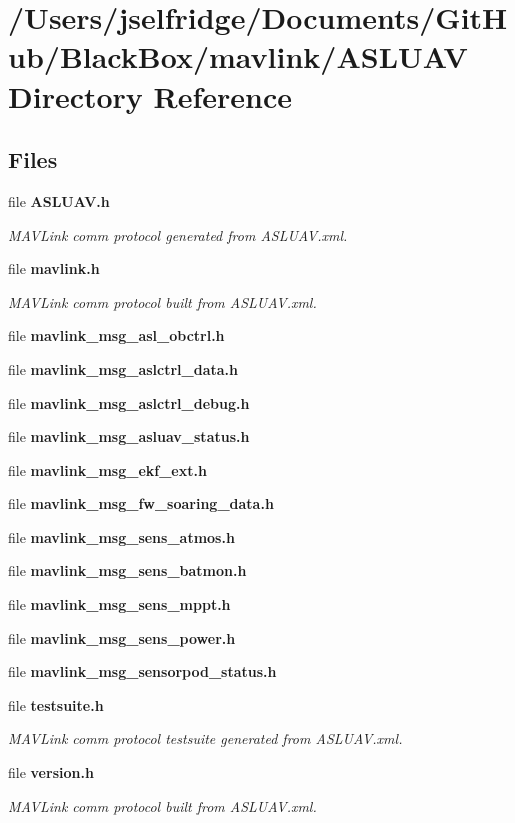 \section{/\+Users/jselfridge/\+Documents/\+Git\+Hub/\+Black\+Box/mavlink/\+A\+S\+L\+U\+AV Directory Reference}
\label{dir_024611f439788c642b5afb5423c3caaf}
\subsection*{Files}
\begin{DoxyCompactItemize}
\item 
file \textbf{ A\+S\+L\+U\+A\+V.\+h}
\begin{DoxyCompactList}\small\item\em M\+A\+V\+Link comm protocol generated from A\+S\+L\+U\+A\+V.\+xml. \end{DoxyCompactList}\item 
file \textbf{ mavlink.\+h}
\begin{DoxyCompactList}\small\item\em M\+A\+V\+Link comm protocol built from A\+S\+L\+U\+A\+V.\+xml. \end{DoxyCompactList}\item 
file \textbf{ mavlink\+\_\+msg\+\_\+asl\+\_\+obctrl.\+h}
\item 
file \textbf{ mavlink\+\_\+msg\+\_\+aslctrl\+\_\+data.\+h}
\item 
file \textbf{ mavlink\+\_\+msg\+\_\+aslctrl\+\_\+debug.\+h}
\item 
file \textbf{ mavlink\+\_\+msg\+\_\+asluav\+\_\+status.\+h}
\item 
file \textbf{ mavlink\+\_\+msg\+\_\+ekf\+\_\+ext.\+h}
\item 
file \textbf{ mavlink\+\_\+msg\+\_\+fw\+\_\+soaring\+\_\+data.\+h}
\item 
file \textbf{ mavlink\+\_\+msg\+\_\+sens\+\_\+atmos.\+h}
\item 
file \textbf{ mavlink\+\_\+msg\+\_\+sens\+\_\+batmon.\+h}
\item 
file \textbf{ mavlink\+\_\+msg\+\_\+sens\+\_\+mppt.\+h}
\item 
file \textbf{ mavlink\+\_\+msg\+\_\+sens\+\_\+power.\+h}
\item 
file \textbf{ mavlink\+\_\+msg\+\_\+sensorpod\+\_\+status.\+h}
\item 
file \textbf{ testsuite.\+h}
\begin{DoxyCompactList}\small\item\em M\+A\+V\+Link comm protocol testsuite generated from A\+S\+L\+U\+A\+V.\+xml. \end{DoxyCompactList}\item 
file \textbf{ version.\+h}
\begin{DoxyCompactList}\small\item\em M\+A\+V\+Link comm protocol built from A\+S\+L\+U\+A\+V.\+xml. \end{DoxyCompactList}\end{DoxyCompactItemize}

